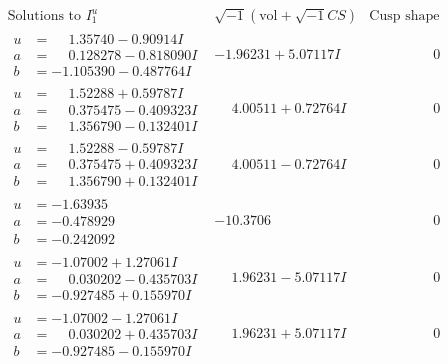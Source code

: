 \documentclass[1p]{elsarticle_modified}
\theoremstyle{definition}
\newcommand{\I}{\sqrt{-1}}
\begin{document}
$$\begin{array}{c|c|c}
\text{Solutions to }I^u_{1}& \I (\text{vol} + \sqrt{-1}CS) & \text{Cusp shape}\\
 \hline 
\begin{aligned}
u &= \phantom{-}1.35740 - 0.90914 I \\
a &= \phantom{-}0.128278 - 0.818090 I \\
b &= -1.105390 - 0.487764 I\end{aligned}
 & -1.96231 + 5.07117 I & \phantom{-0.000000 } 0 \\ \hline\begin{aligned}
u &= \phantom{-}1.52288 + 0.59787 I \\
a &= \phantom{-}0.375475 - 0.409323 I \\
b &= \phantom{-}1.356790 - 0.132401 I\end{aligned}
 & \phantom{-}4.00511 + 0.72764 I & \phantom{-0.000000 } 0 \\ \hline\begin{aligned}
u &= \phantom{-}1.52288 - 0.59787 I \\
a &= \phantom{-}0.375475 + 0.409323 I \\
b &= \phantom{-}1.356790 + 0.132401 I\end{aligned}
 & \phantom{-}4.00511 - 0.72764 I & \phantom{-0.000000 } 0 \\ \hline\begin{aligned}
u &= -1.63935\phantom{ +0.000000I} \\
a &= -0.478929\phantom{ +0.000000I} \\
b &= -0.242092\phantom{ +0.000000I}\end{aligned}
 & -10.3706\phantom{ +0.000000I} & \phantom{-0.000000 } 0 \\ \hline\begin{aligned}
u &= -1.07002 + 1.27061 I \\
a &= \phantom{-}0.030202 - 0.435703 I \\
b &= -0.927485 + 0.155970 I\end{aligned}
 & \phantom{-}1.96231 - 5.07117 I & \phantom{-0.000000 } 0 \\ \hline\begin{aligned}
u &= -1.07002 - 1.27061 I \\
a &= \phantom{-}0.030202 + 0.435703 I \\
b &= -0.927485 - 0.155970 I\end{aligned}
 & \phantom{-}1.96231 + 5.07117 I & \phantom{-0.000000 } 0 \\ \hline\begin{aligned}

\end{aligned}
\end{array}$$
\end{document}
